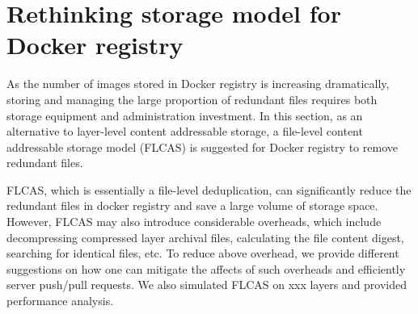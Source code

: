 \section{Rethinking storage model for Docker registry}
\label{sec:file_adressable}
%
%
As the number of images stored in Docker registry is increasing dramatically,
storing and managing the large proportion of redundant files requires both
storage equipment and administration investment.  In this section, as an
alternative to layer-level content addressable storage, a file-level content
addressable storage model (FLCAS) is suggested for Docker registry to remove
redundant files.%

FLCAS, which is essentially a file-level
deduplication, can significantly reduce the redundant files in docker registry
and save a large volume of storage space. However, FLCAS may also
introduce considerable overheads, which include decompressing compressed layer
archival files, calculating the file content digest, searching for identical
files, etc. 
To reduce above overhead, we provide different suggestions on how one can
mitigate the affects of such overheads and efficiently server push/pull requests. We also simulated FLCAS on xxx layers and provided performance analysis.



